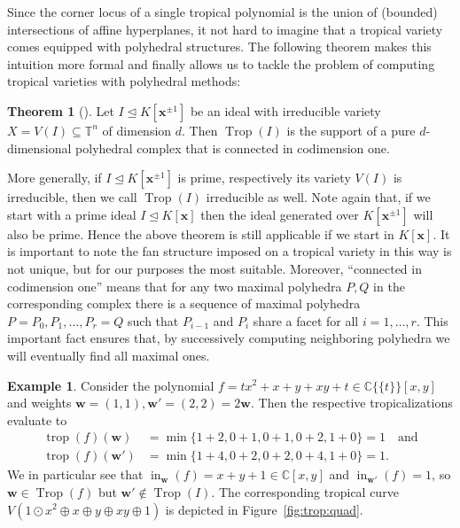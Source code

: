 \documentclass[
  paper=a4,
  titlepage,
  bibliography=totoc,
  pagesize=pdftex
]{scrartcl}
\numberwithin{figure}{section}
\numberwithin{equation}{section}
\numberwithin{table}{section}
\newcommand*\setC{\mathds{C}}
\newcommand*\setT{\mathds{T}}
\newcommand*\puiseux[2]{#1\{\!\{#2\}\!\}}
\newcommand*\CCt{\puiseux{\setC}{t}}
\let\vec\mathbf
\let\idealof\trianglelefteq
\DeclareMathOperator{\Trop}{Trop}
\DeclareMathOperator{\trop}{trop}
\DeclareMathOperator{\initial}{in}
\theoremstyle{definition}
\newtheorem{theorem}[definition]{Theorem}
\newtheorem{example}[definition]{Example}
\numberwithin{definition}{section}
\begin{document}
Since the corner locus of a single tropical polynomial is the union of (bounded)
intersections of affine hyperplanes, it not hard to imagine that a tropical variety comes
equipped with polyhedral structures. The following theorem makes this intuition more
formal and finally allows us to tackle the problem of computing tropical varieties with
polyhedral methods:

\begin{theorem}[{\cite[Theorem~3.5.1]{sturmMacTrop}}]
  \label{thm:tropComplexConn}
  Let $I \idealof K[\vec x^{\pm1}]$ be an ideal with irreducible variety $X = V(I)
  \subseteq \setT^n$ of dimension $d$. Then $\Trop(I)$ is the support of a pure
  $d$-dimensional polyhedral complex that is connected in codimension one.
\end{theorem}

More generally, if $I \idealof K[\vec x^{\pm1}]$ is prime, respectively its variety $V(I)$
is irreducible, then we call $\Trop(I)$ irreducible as well. Note again that, if we start
with a prime ideal $I \idealof K[\vec x]$ then the ideal generated over $K[\vec x^{\pm1}]$
will also be prime. Hence the above theorem is still applicable if we start in $K[\vec
x]$. It is important to note the fan structure imposed on a tropical variety in this way
is not unique, but for our purposes the most suitable. Moreover, \enquote{connected in
codimension one} means that for any two maximal polyhedra $P, Q$ in the corresponding
complex there is a sequence of maximal polyhedra $P = P_0, P_1, \dots, P_r = Q$ such that
$P_{i-1}$ and $P_i$ share a facet for all $i = 1, \dots, r$. This important fact ensures
that, by successively computing neighboring polyhedra we will eventually find all maximal
ones.

\begin{example}
  \label{ex:notFan}
  Consider the polynomial $f = tx^2 + x + y + xy + t \in \CCt[x,y]$ and weights $\vec w =
  (1,1), \vec w' = (2,2) = 2 \vec w$. Then the respective tropicalizations evaluate to
  \begin{align*}
    \trop(f)(\vec w) &= \min \{ 1 + 2, 0 + 1, 0 + 1, 0 + 2, 1 + 0 \} = 1 \quad
    \text{and} \\
    \trop(f)(\vec w') &= \min \{ 1 + 4, 0 + 2, 0 + 2, 0 + 4, 1 + 0 \} = 1.
  \end{align*}
  We in particular see that $\initial_{\vec w}(f) = x+y+1 \in \setC[x,y]$ and
  $\initial_{\vec w'}(f) = 1$, so $\vec w \in \Trop(f)$ but $\vec w' \not\in \Trop(I)$.
  The corresponding tropical curve $V(1\odot x^2 \oplus x \oplus y \oplus xy \oplus 1)$ is
  depicted in Figure~\ref{fig:trop:quad}.
\end{example}
\end{document}
